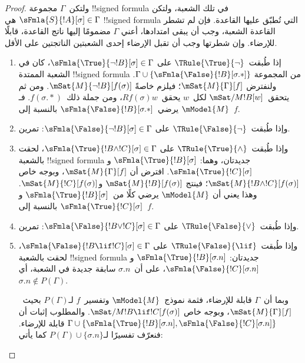 \documentclass[../../../include/open-logic-section]{subfiles}
\begin{document}
\begin{proof}
ولتكن~$\Gamma$ مجموعة !!{signed formula} في تلك الشعبة، ولتكن
$\sFmla{S}{!A}[\sigma] \in \Gamma$ هي !!{signed formula} التي تُطبّق
عليها القاعدة. فإن لم تشطر القاعدة الشعبة، وجب أن يبقى امتدادها، أعني
$\Gamma$ مضمومًا إليها ناتج القاعدة، قابلًا للإرضاء. وإن شطرتها وجب أن
تقبل الإرضاء إحدى الشعبتين الناتجتين على الأقل.
\begin{enumerate}
\item إذا طُبقت~$\TRule{\True}{\lnot}$ على
  $\sFmla{\True}{\lnot !B}[\sigma] \in \Gamma$، كان في الشعبة
  الممتدة !!{signed formula} من المجموعة
  $\Gamma \cup \{\sFmla{\False}{!B}[\sigma.{*}]\}$. ولنفترض
  $\mSat{M}{\Gamma}[f]$؛ فيلزم خاصةً
  $\mSat{M}{\lnot !B}[f(\sigma)]$. ومن ثم يتحقق~$\mSat/{M}{!B}[w]$
  لكل~$w$ يحقق~$Rf(\sigma)w$، ومن جملة ذلك~$f(\sigma.{*})$. فـ
  $\mModel{M}$ يرضي~$\sFmla{\False}{!B}[\sigma.{*}]$ بالنسبة إلى~$f$.
\item وإذا طُبقت~$\TRule{\False}{\lnot}$ على
  $\sFmla{\False}{\lnot !B}[\sigma] \in \Gamma$: تمرين.
\item وإذا طُبقت~$\TRule{\True}{\land}$ على
  $\sFmla{\True}{!B \land !C}[\sigma] \in \Gamma$، لحقت بالشعبة
  !!{signed formula} جديدتان، وهما:
  $\sFmla{\True}{!B}[\sigma]$ و$\sFmla{\True}{!C}[\sigma]$. افترض أن
  $\mSat{M}{\Gamma}[f]$، وبوجه خاص
  $\mSat{M}{!B \land !C}[f(\sigma)]$؛ فينتج
  $\mSat{M}{!B}[f(\sigma)]$ و$\mSat{M}{!C}[f(\sigma)]$. وهذا يعني أن
  $\mModel{M}$ يرضي كلًا من~$\sFmla{\True}{!B}[\sigma]$
  و$\sFmla{\True}{!C}[\sigma]$ بالنسبة إلى~$f$.
\item وإذا طُبقت~$\TRule{\False}{\lor}$ على
  $\sFmla{\False}{!B \lor !C}[\sigma] \in \Gamma$: تمرين.
\item وإذا طُبقت~$\TRule{\False}{\lif}$ على
  $\sFmla{\False}{!B \lif !C}[\sigma] \in \Gamma$، لحقت بالشعبة
  !!{signed formula} جديدتان:
  $\sFmla{\True}{!B}[\sigma.n]$ و$\sFmla{\False}{!C}[\sigma.n]$،
  على أن~$\sigma.n$ سابقة جديدة في الشعبة، أي
  $\sigma.n \notin P(\Gamma)$.

  وبما أن~$\Gamma$ قابلة للإرضاء، فثمة نموذج~$\mModel{M}$ وتفسير~$f$
  لـ$P(\Gamma)$ بحيث~$\mSat{M}{\Gamma}[f]$، وبوجه خاص
  $\mSat/{M}{!B \lif !C}[f(\sigma)]$. والمطلوب إثبات أن
  $\Gamma \cup \{\sFmla{\True}{!B}[\sigma.n],
  \sFmla{\False}{!C}[\sigma.n]\}$ قابلة للإرضاء. فنعرّف
  تفسيرًا لـ$P(\Gamma) \cup \{\sigma.n\}$ كما يأتي:


\end{enumerate}
\end{proof}
\end{document}
